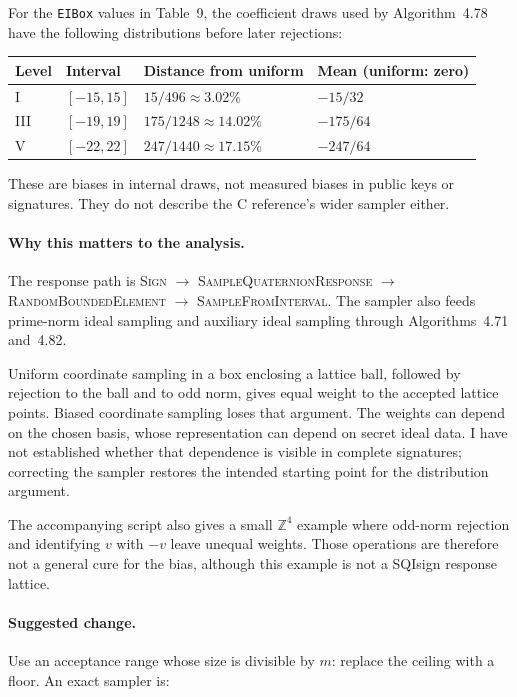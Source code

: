 \documentclass[a4paper,11pt]{article}
\newcommand{\algo}[1]{Algorithm~#1}
\newcommand{\code}[1]{\texttt{#1}}
\begin{document}
For the \code{EIBox} values in Table~9, the coefficient draws used by
\algo{4.78} have the following distributions before later rejections:

\begin{center}
\begin{tabular}{@{}llll@{}}
\toprule
Level & Interval & Distance from uniform & Mean (uniform: zero)\\
\midrule
I & $[-15,15]$ & $15/496\approx 3.02\%$ & $-15/32$\\
III & $[-19,19]$ & $175/1248\approx 14.02\%$ & $-175/64$\\
V & $[-22,22]$ & $247/1440\approx 17.15\%$ & $-247/64$\\
\bottomrule
\end{tabular}
\end{center}

These are biases in internal draws, not measured biases in public keys or
signatures. They do not describe the C reference's wider sampler either.

\paragraph{Why this matters to the analysis.}
The response path is \textsc{Sign} $\to$ \textsc{SampleQuaternionResponse}
$\to$ \textsc{RandomBoundedElement} $\to$ \textsc{SampleFromInterval}.
The sampler also feeds prime-norm ideal sampling and auxiliary ideal
sampling through Algorithms~4.71 and~4.82.

Uniform coordinate sampling in a box enclosing a lattice ball, followed by
rejection to the ball and to odd norm, gives equal weight to the accepted
lattice points. Biased coordinate sampling loses that argument. The weights
can depend on the chosen basis, whose representation can depend on secret
ideal data. I have not established whether that dependence is visible in
complete signatures; correcting the sampler restores the intended starting
point for the distribution argument.

The accompanying script also gives a small $\mathbb{Z}^4$ example where
odd-norm rejection and identifying $v$ with $-v$ leave unequal weights.
Those operations are therefore not a general cure for the bias, although
this example is not a SQIsign response lattice.

\paragraph{Suggested change.}
Use an acceptance range whose size is divisible by $m$: replace the
ceiling with a floor. An exact sampler is:
\end{document}
